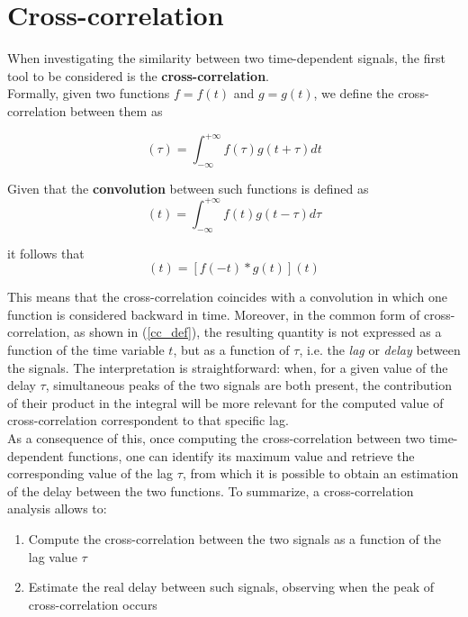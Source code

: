 \documentclass[12pt, a4paper]{report}
\begin{document}
\section{Cross-correlation}

When investigating the similarity between two time-dependent signals, the first tool to be considered is the \textbf{cross-correlation}.\\
Formally, given two functions $ f = f(t)$ and $ g = g(t)$, we define the cross-correlation between them as

\begin{equation}
[f(t) \star g(t)] (\tau) = \int_{-\infty}^{+\infty} f(\tau)g(t+\tau) dt \label{cc_def}
\end{equation}


Given that the \textbf{convolution} between such functions is defined as 
\begin{equation}
[f(t) * g (t)](t) = \int_{-\infty}^{+\infty} f(t) g (t-\tau) d\tau
\end{equation}

it follows that
\begin{equation}
[f(t) \star g(t)](t) = [f(-t) * g (t)](t) 
\end{equation}

This means that the cross-correlation coincides with a convolution in which one function is considered backward in time. Moreover, in the common form of cross-correlation, as shown in (\ref{cc_def}), the resulting quantity is not expressed as a function of the time variable $t$, but as a function of $\tau$, i.e. the \textit{lag} or \textit{delay} between the signals. The interpretation is straightforward: when, for a given value of the delay $\tau$, simultaneous peaks of the two signals are both present, the contribution of their product in the integral will be more relevant for the computed value of cross-correlation correspondent to  that specific lag.\\
As a consequence of this, once computing the cross-correlation between two time-dependent functions, one can identify its maximum value and retrieve the corresponding value of the lag $\tau$, from which it is possible to obtain an estimation of the delay between the two functions. To summarize, a cross-correlation analysis allows to:
\begin{enumerate}
	\item Compute the cross-correlation between the two signals as a function of the lag value  $\tau$
	
	\item Estimate the real delay between such signals, observing when the peak of cross-correlation occurs
\end{enumerate}
\end{document}
